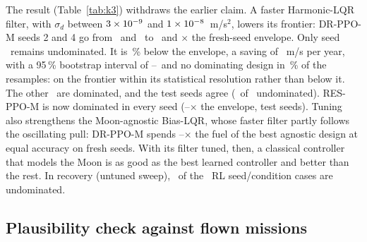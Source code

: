 \documentclass[11pt,a4paper]{article}
\newcommand{\dv}{\Delta v}
\begin{document}
The result (Table~\ref{tab:k3}) withdraws the earlier claim. A faster
Harmonic-LQR filter, with $\sigma_d$ between $3\times10^{-9}$ and
$1\times10^{-8}$~m/s$^2$, lowers its frontier: DR-PPO-M seeds 2 and 4 go from \kThreeBeforeTwo\ and
\kThreeBeforeFour\ to \kThreeAfterTwo\ and \kThreeAfterFour$\times$ the
fresh-seed envelope. Only seed \kThreeBestSeed\ remains undominated. It is
\kThreeBestPct\,\% below the envelope, a saving of \kThreeBestSave~m/s per
year, with a 95\,\% bootstrap interval of \kThreeBestLo--\kThreeBestHi\ and
no dominating design in \kThreeBestPnd\,\% of the resamples: on the frontier
within its statistical resolution rather than below it. The other
\kThreeFreshDomWord\ are dominated, and the test seeds agree (\kThreeTestNd\
of \kThreeOf\ undominated). RES-PPO-M is now dominated in every seed
(\kThreeResmEnvMin--\kThreeResmEnvMax$\times$ the envelope, test seeds). Tuning
also strengthens the Moon-agnostic Bias-LQR, whose faster filter partly
follows the oscillating pull: DR-PPO-M spends
\kThreeAgnMin--\kThreeAgnMax$\times$ the fuel of the best agnostic design at
equal accuracy on fresh seeds. With its filter tuned, then, a classical
controller that models the Moon is as good as the best learned controller and
better than the rest. In recovery (untuned sweep), \moRecNd\ of the \moRecOf\
RL seed/condition cases are undominated.

\begin{table}[t]
\centering
\caption{DR-PPO-M against the classical designs with tuned filters
(Section~\ref{sec:moon}), $k = 1$ + Moon, holding: mean distance and yearly
$\dv$ (fresh seeds), envelope ratio before (scripts~19--20) and after the
filter search, paired bootstrap 95\,\% interval and share of resamples in which
no design dominates the agent; test seeds as a secondary check.}
\label{tab:k3}
\footnotesize
\setlength{\tabcolsep}{3pt}

\end{table}

\subsection{Plausibility check against flown missions}
\label{sec:missions}
\end{document}

